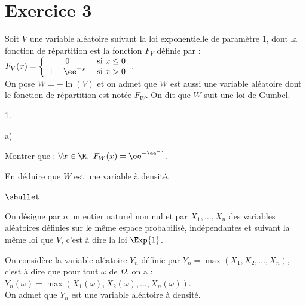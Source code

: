 \documentclass[11pt]{article}%
\begin{document}


\section*{Exercice 3}

\noindent
Soit $V$ une variable aléatoire suivant la loi exponentielle de
paramètre $1$, dont la fonction de répartition est la fonction $F_{V}$
définie par : $F_{V}(x) = \left\{
  \begin{array}{cl}
    0 & \hbox{ si } x \leq 0\\
    1-\ee^{-x} & \hbox{ si } x>0
  \end{array}
\right.$.\\
On pose $W = -\ln(V)$ et on admet que $W$ est aussi une variable
aléatoire dont le fonction de répartition est notée $F_{W}$. On dit
que $W$ suit une loi de Gumbel.
\begin{noliste}{1.}
  \setlength{\itemsep}{4mm}
\item
  \begin{noliste}{a)}
    \setlength{\itemsep}{2mm}
  \item Montrer que : $\forall x \in \R, \ F_{W}(x) =
    \ee^{-\ee^{-x}}$.
    
    
    



  \item En déduire que $W$ est une variable à densité.
  
  
  \end{noliste}
\end{noliste}

\begin{noliste}{$\sbullet$}
\item On désigne par $n$ un entier naturel non nul et par $X_{1},
  \ldots, X_{n}$ des variables aléatoires définies sur le même espace
  probabilisé, indépendantes et suivant la même loi que $V$, c'est à
  dire la loi $\Exp{1}$.

\item On considère la variable aléatoire $Y_{n}$ définie par $Y_{n} =
  \max(X_{1},X_{2}, \ldots,X_{n})$, c'est à dire que pour tout
  $\omega$ de $\Omega$, on a : $Y_{n}(\omega) =
  \max(X_{1}(\omega),X_{2}(\omega), \ldots, X_n(\omega))$.\\
  On admet que $Y_{n}$ est une variable aléatoire à densité.
\end{noliste}
\end{document}
